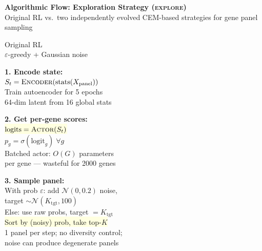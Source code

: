 \documentclass[8pt]{article}
\newlength{\colw}
\begin{document}
\setlength{\colw}{0.315\textwidth}

\begin{center}
{\large\bfseries Algorithmic Flow: Exploration Strategy (\textsc{explore})}\\[1pt]
{\scriptsize Original RL vs.\ two independently evolved CEM-based strategies for gene panel sampling}
\end{center}
\vspace{2pt}

\noindent
\begin{minipage}[t]{\colw}
\begin{tcolorbox}[colback=hdrA, colframe=hdrA, fontupper=\bfseries\footnotesize\color{white},
    arc=2pt, left=2pt, right=2pt, top=1pt, bottom=1pt]
\centering Original RL\\[-2pt]
{\scriptsize\mdseries $\varepsilon$-greedy + Gaussian noise}
\end{tcolorbox}
\vspace{1pt}

\begin{warnbox}
\textbf{1. Encode state:}\\
$S_t = \textsc{Encoder}(\text{stats}(X_\text{panel}))$\\
Train autoencoder for 5 epochs\\
{\scriptsize 64-dim latent from 16 global stats}
\end{warnbox}\vspace{1pt}

\begin{warnbox}
\textbf{2. Get per-gene scores:}\\
\colorbox{lightyellow}{$\text{logits} = \textsc{Actor}(S_t)$}\\
$p_g = \sigma(\text{logit}_g) \;\forall g$\\
{\scriptsize\color{removed} Batched actor: $O(G)$ parameters\\per gene --- wasteful for 2000 genes}
\end{warnbox}\vspace{1pt}

\begin{warnbox}
\textbf{3. Sample panel:}\\
With prob $\varepsilon$: add $\mathcal{N}(0,0.2)$ noise,\\
\quad target $\sim \mathcal{N}(K_\text{tgt},100)$\\
Else: use raw probs, target $= K_\text{tgt}$\\
\colorbox{lightyellow}{Sort by (noisy) prob, take top-$K$}\\
{\scriptsize\color{removed} 1 panel per step; no diversity control;\\
noise can produce degenerate panels}
\end{warnbox}\vspace{1pt}


\end{minipage}
\end{document}
